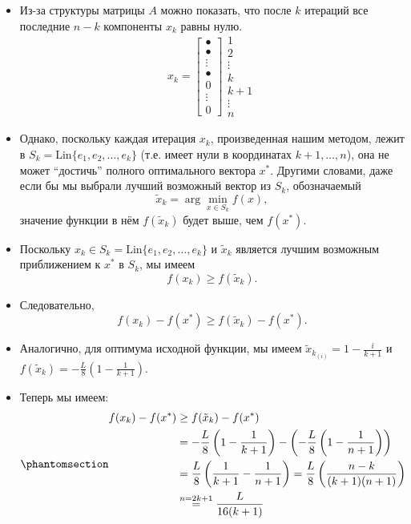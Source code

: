 \documentclass[
  russian,
  letterpaper,
  DIV=11,
  numbers=noendperiod]{scrartcl}
\providecommand{\tightlist}{%
  \setlength{\itemsep}{0pt}\setlength{\parskip}{0pt}}
\begin{document}
\begin{itemize}
\tightlist
\item
  Из-за структуры матрицы \(A\) можно показать, что после \(k\) итераций
  все последние \(n-k\) компоненты \(x_k\) равны нулю. \[
    x_{k} =
    \begin{bmatrix} 
        \bullet \\ 
        \bullet \\ 
        \vdots \\ 
        \bullet \\ 
        0 \\ 
        \vdots \\ 
        0 
    \end{bmatrix}
    \begin{array}{l}
        1 \\ 
        2 \\ 
        \vdots \\ 
        k \\ 
        k+1 \\ 
        \vdots \\ 
        n 
    \end{array}
    \]
\item
  Однако, поскольку каждая итерация \(x_k\), произведенная нашим
  методом, лежит в \(S_k = \text{Lin}\{e_1, e_2, \ldots, e_{k}\}\) (т.е.
  имеет нули в координатах \(k+1,\dots,n\)), она не может ``достичь''
  полного оптимального вектора \(x^*\). Другими словами, даже если бы мы
  выбрали лучший возможный вектор из \(S_k\), обозначаемый \[
  \tilde{x}_k=\arg\min_{x\in S_k} f(x),
  \] значение функции в нём \(f(\tilde{x}_k)\) будет выше, чем
  \(f(x^*)\).
\end{itemize}

\begin{itemize}
\tightlist
\item
  Поскольку \(x_k\in S_k = \text{Lin}\{e_1, e_2, \ldots, e_{k}\}\) и
  \(\tilde{x}_k\) является лучшим возможным приближением к \(x^*\) в
  \(S_k\), мы имеем \[
    f(x_k)\ge f(\tilde{x}_k).
    \]
\item
  Следовательно, \[
    f(x_k)-f(x^*)\ge f(\tilde{x}_k)-f(x^*).
    \]
\item
  Аналогично, для оптимума исходной функции, мы имеем
  \(\tilde{x}_{k_{(i)}} = 1 - \frac{i}{k+1}\) и
  \(f(\tilde{x}_k) = -\frac{L}{8} \left(1 - \frac{1}{k+1}\right)\).
\item
  Теперь мы имеем: \begin{equation}\phantomsection\label{eq-lb1}{
    \begin{aligned}
    f(x_k)-f(x^*) &\ge f(\tilde{x}_k)-f(x^*) \\
    &= -\frac{L}{8} \left(1 - \frac{1}{k+1}\right) - \left(-\frac{L}{8} \left(1 - \frac{1}{n+1}\right)\right) \\
    &= \frac{L}{8} \left(\frac{1}{k+1} - \frac{1}{n+1}\right) = \frac{L}{8} \left(\frac{n-k}{(k+1)(n+1)}\right) \\
    &\overset{n = 2k+1}{=} \frac{L }{16(k+1)}
    \end{aligned}
    }\end{equation}
\end{itemize}
\end{document}
